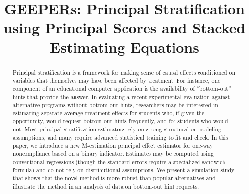 \documentclass[]{article}
\begin{document}



\title{GEEPERs: Principal Stratification using Principal Scores and Stacked Estimating Equations}




\maketitle


\begin{abstract}
Principal stratification is a framework for making sense of causal effects conditioned on variables that themselves may have been affected by treatment. For instance, one component of an educational computer application is the availability of “bottom-out” hints that provide the answer. In evaluating a recent experimental evaluation against alternative programs without bottom-out hints, researchers may be interested in estimating separate average treatment effects for students who, if given the opportunity, would request bottom-out hints frequently, and for students who would not. Most principal stratification estimators rely on strong structural or modeling assumptions, and many require advanced statistical training to fit and check. In this paper, we introduce a new M-estimation principal effect estimator for one-way noncompliance based on a binary indicator. Estimates may be computed using conventional regressions (though the standard errors require a specialized sandwich formula) and do not rely on distributional assumptions. We present a simulation study that shows that the novel method is more robust than popular alternatives and illustrate the method in an analysis of data on bottom-out hint requests.
\end{abstract}
\end{document}
